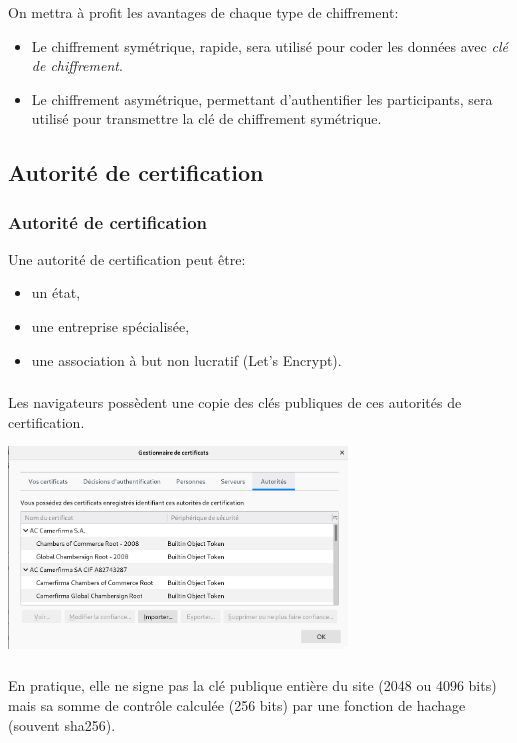 \documentclass[svgnames,11pt]{beamer}
\begin{document}
\begin{frame}
    \frametitle{}
    \begin{aretenir}[]
        On mettra à profit les avantages de chaque type de chiffrement:
        \begin{itemize}
            \item Le chiffrement symétrique, rapide, sera utilisé pour coder les données avec \emph{clé de chiffrement}.
            \item Le chiffrement asymétrique, permettant d'authentifier les participants, sera utilisé pour transmettre la clé de chiffrement symétrique.
        \end{itemize}
        \end{aretenir}
    
\end{frame}
\subsection{Autorité de certification}
\begin{frame}
    \frametitle{Autorité de certification}

    Une autorité de certification peut être:
\begin{itemize}
    \item un état,
    \item une entreprise spécialisée,
    \item une association à but non lucratif (Let's Encrypt).
\end{itemize}

\end{frame}
\begin{frame}
    \frametitle{}

    Les navigateurs possèdent une copie des clés publiques de ces autorités de certification.

\begin{center}
\centering
\includegraphics[width=9cm]{ressources/certificats.png}
\label{IMG}
\end{center}


\end{frame}
\begin{frame}
    \frametitle{}

    En pratique, elle ne signe pas la clé publique entière du site (2048 ou 4096 bits) mais sa somme de contrôle calculée (256 bits) par une fonction de hachage (souvent sha256).

\end{frame}
\end{document}
